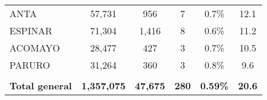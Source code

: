 \begin{tabular}{lccccc}
	\cellcolor[HTML]{FFFF99}ANTA                                    & 57,731               & 956                                  & 7                    & 0.7\%                      & 12.1                                        \\
	\cellcolor[HTML]{FFFF99}ESPINAR                                 & 71,304               & 1,416                                & 8                    & 0.6\%                      & 11.2                                        \\
	\cellcolor[HTML]{FFFF99}ACOMAYO                                 & 28,477               & 427                                  & 3                    & 0.7\%                      & 10.5                                        \\
	\cellcolor[HTML]{FFFF99}PARURO                                  & 31,264               & 360                                  & 3                    & 0.8\%                      & 9.6                                         \\
	& \multicolumn{1}{l}{} & \multicolumn{1}{l}{}                 & \multicolumn{1}{l}{} & \multicolumn{1}{l}{}       & \multicolumn{1}{l}{}                        \\
	\rowcolor[HTML]{DDEBF7} 
	\textbf{Total general}                                          & \textbf{1,357,075}   & \textbf{47,675}                      & \textbf{280}         & \textbf{0.59\%}            & \textbf{20.6}                              
\end{tabular}